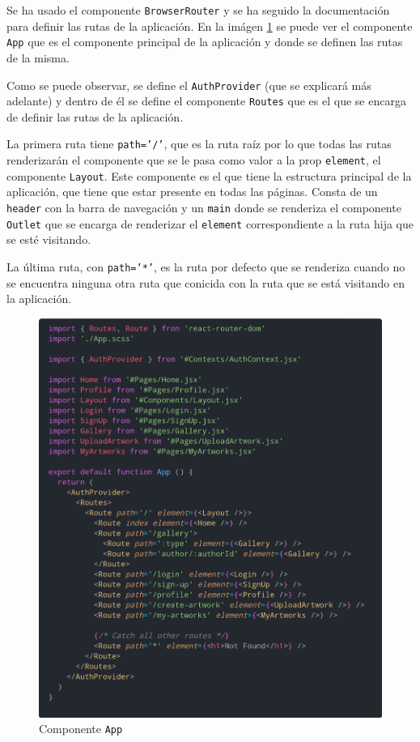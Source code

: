 Se ha usado el componente \texttt{BrowserRouter} y se ha seguido la documentación
\cite{browser-router} para definir las rutas de la aplicación. En la imágen
\ref{fig:app} se puede ver el componente \texttt{App} que es el componente principal
de la aplicación y donde se definen las rutas de la misma.

Como se puede observar, se define el \texttt{AuthProvider} (que se explicará más adelante)
y dentro de él se define el componente \texttt{Routes} que es el que se encarga de
definir las rutas de la aplicación.

La primera ruta tiene \texttt{path='/'}, que es la ruta raíz por lo que todas las rutas
renderizarán el componente que se le pasa como valor a la prop \texttt{element}, el
componente \texttt{Layout}. Este componente es el que tiene la estructura principal de la
aplicación, que tiene que estar presente en todas las páginas. Consta de un \texttt{header}
con la barra de navegación y un \texttt{main} donde se renderiza el componente
\texttt{Outlet} \cite{outlet} que se encarga de renderizar el \texttt{element}
correspondiente a la ruta hija que se esté visitando.

La última ruta, con \texttt{path='*'}, es la ruta por defecto que se renderiza cuando
no se encuentra ninguna otra ruta que conicida con la ruta que se está visitando en la
aplicación.

\begin{figure}[H]
  \centering
  \includegraphics[width=1\textwidth]{img/app}
  \caption{Componente \texttt{App}}
  \label{fig:app}
\end{figure}

